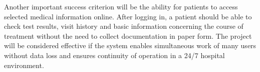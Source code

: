 Another important success criterion will be the ability for patients to access selected medical information online. After logging in, a patient should be able to check test results, visit history and basic information concerning the course of treatment without the need to collect documentation in paper form.
The project will be considered effective if the system enables simultaneous work of many users without data loss and ensures continuity of operation in a 24/7 hospital environment.
